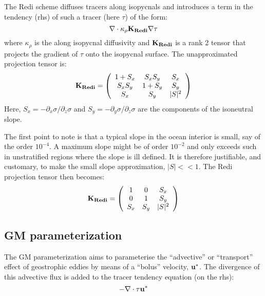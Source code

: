 The Redi scheme diffuses tracers along isopycnals and introduces a
term in the tendency (rhs) of such a tracer (here $\tau$) of the form:
\begin{equation}
\bf{\nabla} \cdot \kappa_\rho \bf{K}_{Redi}  \bf{\nabla} \tau
\end{equation}
where $\kappa_\rho$ is the along isopycnal diffusivity and
$\bf{K}_{Redi}$ is a rank 2 tensor that projects the gradient of
$\tau$ onto the isopycnal surface. The unapproximated projection tensor is:
\begin{equation}
\bf{K}_{Redi} = \left(
\begin{array}{ccc}
1 + S_x& S_x S_y & S_x \\
S_x S_y  & 1 + S_y & S_y \\
S_x & S_y & |S|^2 \\
\end{array}
\right)
\end{equation}
Here, $S_x = -\partial_x \sigma / \partial_z \sigma$ and $S_y =
-\partial_y \sigma / \partial_z \sigma$ are the components of the
isoneutral slope.

The first point to note is that a typical slope in the ocean interior
is small, say of the order $10^{-4}$. A maximum slope might be of
order $10^{-2}$ and only exceeds such in unstratified regions where
the slope is ill defined. It is therefore justifiable, and
customary, to make the small slope approximation, $|S| << 1$. The Redi
projection tensor then becomes:
\begin{equation}
\bf{K}_{Redi} = \left(
\begin{array}{ccc}
1 & 0 & S_x \\
0 & 1 & S_y \\
S_x & S_y & |S|^2 \\
\end{array}
\right)
\end{equation}


\subsection{GM parameterization}

The GM parameterization aims to parameterise the ``advective'' or
``transport'' effect of geostrophic eddies by means of a ``bolus''
velocity, $\bf{u}^*$. The divergence of this advective flux is added
to the tracer tendency equation (on the rhs):
\begin{equation}
- \bf{\nabla} \cdot \tau \bf{u}^*
\end{equation}

